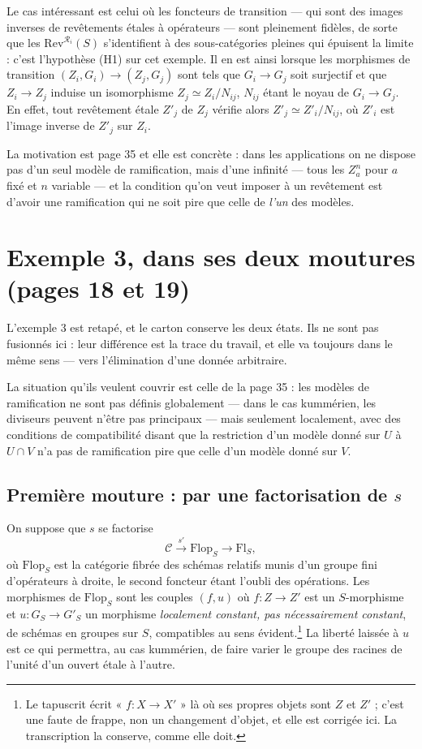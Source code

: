 \documentclass[11pt,a4paper]{article}
\begin{document}
Le cas intéressant est celui où les foncteurs de transition --- qui sont des
images inverses de revêtements étales à opérateurs --- sont pleinement fidèles,
de sorte que les $\mathrm{Rev}^{\mathcal{R}_{i}}(S)$ s'identifient à des
sous-catégories pleines qui épuisent la limite : c'est l'hypothèse (H1) sur cet
exemple. Il en est ainsi lorsque les morphismes de transition
$(Z_{i}, G_{i}) \to (Z_{j}, G_{j})$ sont tels que $G_{i} \to G_{j}$ soit
surjectif et que $Z_{i} \to Z_{j}$ induise un isomorphisme
$Z_{j} \simeq Z_{i}/N_{ij}$, $N_{ij}$ étant le noyau de $G_{i} \to G_{j}$. En
effet, tout revêtement étale $Z'_{j}$ de $Z_{j}$ vérifie alors
$Z'_{j} \simeq Z'_{i}/N_{ij}$, où $Z'_{i}$ est l'image inverse de $Z'_{j}$
sur $Z_{i}$.

La motivation est page 35 et elle est concrète : dans les applications on ne
dispose pas d'un seul modèle de ramification, mais d'une infinité --- tous les
$Z^{n}_{a}$ pour $a$ fixé et $n$ variable --- et la condition qu'on veut
imposer à un revêtement est d'avoir une ramification qui ne soit pire que celle
de \emph{l'un} des modèles.

\section*{Exemple 3, dans ses deux moutures (pages 18 et 19)}

L'exemple 3 est retapé, et le carton conserve les deux états. Ils ne sont pas
fusionnés ici : leur différence est la trace du travail, et elle va toujours
dans le même sens --- vers l'élimination d'une donnée arbitraire.

La situation qu'ils veulent couvrir est celle de la page 35 : les modèles de
ramification ne sont pas définis globalement --- dans le cas kummérien, les
diviseurs peuvent n'être pas principaux --- mais seulement localement, avec des
conditions de compatibilité disant que la restriction d'un modèle donné sur $U$
à $U \cap V$ n'a pas de ramification pire que celle d'un modèle donné sur $V$.

\subsection*{Première mouture : par une factorisation de $s$}

On suppose que $s$ se factorise
\[
  \mathcal{C} \xrightarrow{\ s'\ } \mathrm{Flop}_{S} \longrightarrow
  \mathrm{Fl}_{S} ,
\]
où $\mathrm{Flop}_{S}$ est la catégorie fibrée des schémas relatifs munis d'un
groupe fini d'opérateurs à droite, le second foncteur étant l'oubli des
opérations. Les morphismes de $\mathrm{Flop}_{S}$ sont les couples $(f, u)$ où
$f : Z \to Z'$ est un $S$-morphisme et $u : G_{S} \to G'_{S}$ un morphisme
\emph{localement constant, pas nécessairement constant}, de schémas en
groupes sur $S$, compatibles au sens évident.\footnote{Le tapuscrit écrit
« $f : X \to X'$ » là où ses propres objets sont $Z$ et $Z'$ ; c'est une faute
de frappe, non un changement d'objet, et elle est corrigée ici. La
transcription la conserve, comme elle doit.} La liberté laissée à $u$ est ce
qui permettra, au cas kummérien, de faire varier le groupe des racines de
l'unité d'un ouvert étale à l'autre.
\end{document}
